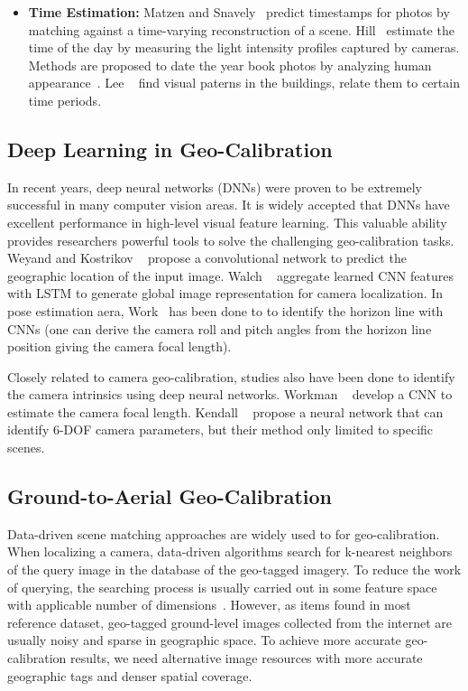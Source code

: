 \begin{itemize}[noitemsep]
\item \textbf{Time Estimation:}
Matzen and Snavely~\cite{matzen2014scene} predict
timestamps for photos by matching against a time-varying
reconstruction of a scene.  Hill~\cite{hill1994elephant} estimate the
time of the day by measuring the light intensity profiles captured by
cameras. Methods are proposed to date the
year book photos by analyzing human
appearance~\cite{salem2016face2year,ginosar2015century}. Lee
\etal~\cite{linking2015iccp} find visual paterns in the buildings,
relate them to certain time periods.
\newline

\end{itemize}

\subsection{Deep Learning in Geo-Calibration}
In recent years, deep neural networks (DNNs) were proven to be
extremely successful in many computer vision areas. 
It is widely accepted that DNNs have excellent performance in
high-level visual feature learning.
This valuable ability provides researchers powerful tools to
solve the challenging geo-calibration tasks.
Weyand and Kostrikov \etal~\cite{planet} propose a convolutional
network to predict the geographic location of the input
image. Walch \etal~\cite{walch2017image} aggregate learned CNN
features with LSTM to generate global image representation for camera
localization.  In pose estimation aera, Work~\cite{zhai2016horizon,
workman2016horizon, hold2017perceptual} has been done to to identify
the horizon line with CNNs (one can derive the camera roll and pitch
angles from the horizon line position giving the camera focal length).

Closely related to camera geo-calibration, studies also have been done
to identify the camera intrinsics using deep neural networks.
Workman \etal~\cite{workman2015deepfocal} develop a CNN to estimate the camera
focal length. Kendall \etal~\cite{kendall2015convolutional} propose a
neural network that can identify 6-DOF camera parameters, but their
method only limited to specific scenes.


\subsection{Ground-to-Aerial Geo-Calibration}
Data-driven scene matching approaches are widely used to for
geo-calibration.
When localizing a camera, data-driven algorithms search for k-nearest
neighbors of the query image in the database of the geo-tagged imagery.
To reduce the work of querying, the searching process is usually
carried out in some feature space with applicable number of  
dimensions~\cite{im2gps, li2010location,zamir2010accurate}.
However, as items found in most reference dataset, geo-tagged
ground-level images collected from the internet are usually noisy and
sparse in geographic space. To achieve more accurate geo-calibration
results, we need alternative image resources with more accurate
geographic tags and denser spatial coverage.

